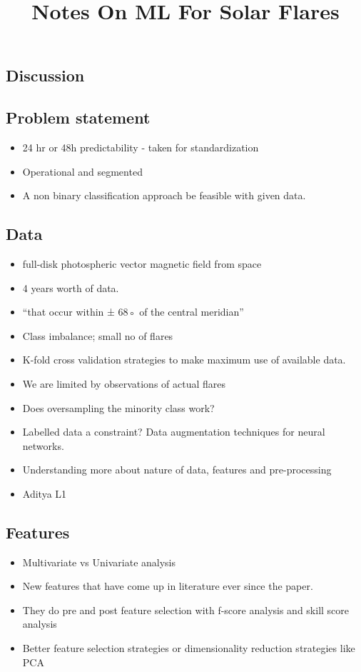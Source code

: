 \documentclass{../template/texnote}
\title{Notes On ML For Solar Flares}
\begin{document}
    \maketitle {}
	\subsection{Discussion}

	\subsection{Problem statement}
	\begin{itemize}
		\item 24 hr or 48h predictability - taken for standardization 
		\item Operational and segmented
		\item A non binary classification approach be feasible with given data. 
	\end{itemize}
	
	\subsection{Data}
	\begin{itemize}
		\item full-disk photospheric vector magnetic field from space
		\item 4 years worth of data.
		\item “that occur within ± 68◦ of the central meridian”
		\item Class imbalance; small no of flares
		\item K-fold cross validation strategies to make maximum use of available data. 
		\item We are limited by observations of actual flares
		\item Does oversampling the minority class work? 
		\item Labelled data a constraint? Data augmentation techniques for neural networks.
		\item Understanding more about nature of data, features and pre-processing
		\item Aditya L1 

	\end{itemize}
	\subsection{Features}
	\begin{itemize}
		\item Multivariate vs Univariate analysis
		\item New features that have come up in literature ever since the paper.
		\item They do pre and post feature selection with f-score analysis and skill score analysis
		\item Better feature selection strategies or dimensionality reduction strategies like PCA 
	\end{itemize}
\end{document}
